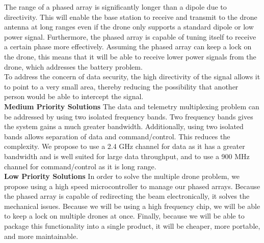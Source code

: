 \documentclass[11pt]{article}
\numberwithin{figure}{section}
\begin{document}
	The range of a phased array is significantly longer than a dipole due to directivity.  This will enable the base station to receive and transmit to the drone antenna at long ranges even if the drone only supports a standard dipole or low power signal. Furthermore, the phased array is capable of tuning itself to receive a certain phase more effectively. Assuming the phased array can keep a lock on the drone, this means that it will be able to receive lower power signals from the drone, which addresses the battery problem.  \\
	
	To address the concern of data security, the high directivity of the signal allows it to point to a very small area, thereby reducing the possibility that another person would be able to intercept the signal.\\
	
	\textbf{Medium Priority Solutions}
	The data and telemetry multiplexing problem can be addressed by using two isolated frequency bands. Two frequency bands gives the system gains a much greater bandwidth.  Additionally, using two isolated bands allows separation of data and command/control.  This reduces the complexity.  We propose to use a 2.4 GHz channel for data as it has a greater bandwidth and is well suited for large data throughput, and to use a 900 MHz channel for command/control as it is long range. \\
	
	\textbf{Low Priority Solutions}
	In order to solve the multiple drone problem, we propose using a high speed microcontroller to manage our phased arrays. Because the phased array is capable of redirecting the beam electronically, it solves the mechanical issues. Because we will be using a high frequency chip, we will be able to keep a lock on multiple drones at once. Finally, because we will be able to package this functionality into a single product, it will be cheaper, more portable, and more maintainable.
\end{document}
